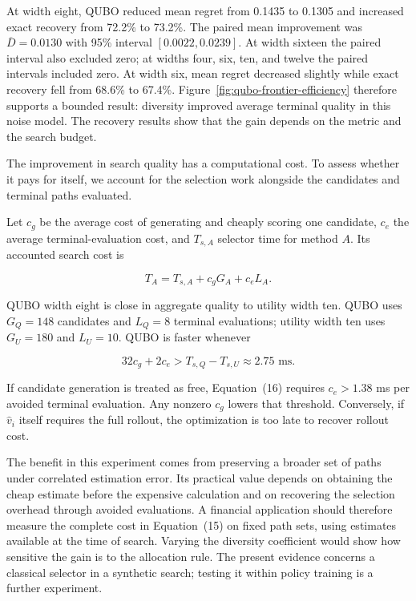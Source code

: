 \documentclass{strategynet-journal}
\begin{document}
At width eight, QUBO reduced mean regret from 0.1435 to 0.1305 and increased
exact recovery from 72.2\% to 73.2\%.  The paired mean improvement was
$\overline D=0.0130$ with 95\% interval $[0.0022,0.0239]$.  At width sixteen
the paired interval also excluded zero; at widths four, six, ten, and twelve
the paired intervals included zero.  At width six, mean regret decreased slightly while exact recovery
fell from 68.6\% to 67.4\%.  Figure~\ref{fig:qubo-frontier-efficiency} therefore
supports a bounded result: diversity improved average terminal quality in this
noise model. The recovery results show that the gain depends on the metric
and the search budget.

The improvement in search quality has a computational cost. To assess whether
it pays for itself, we account for the selection work alongside the candidates
and terminal paths evaluated.

Let $c_g$ be the average cost of generating and cheaply scoring one candidate,
$c_e$ the average terminal-evaluation cost, and $T_{s,A}$ selector time for
method $A$.  Its accounted search cost is

\[
 T_A=T_{s,A}+c_gG_A+c_eL_A .
 \tag{15}
\]

QUBO width eight is close in aggregate quality to utility width ten.  QUBO
uses $G_Q=148$ candidates and $L_Q=8$ terminal evaluations; utility width ten
uses $G_U=180$ and $L_U=10$.  QUBO is faster whenever

\[
 32c_g+2c_e>T_{s,Q}-T_{s,U}\approx2.75\text{ ms} .
 \tag{16}
\]

If candidate generation is treated as free, Equation~(16) requires
$c_e>1.38$ ms per avoided terminal evaluation.  Any nonzero $c_g$ lowers that
threshold.  Conversely, if $\widehat v_i$ itself requires the full rollout,
the optimization is too late to recover rollout cost.

The benefit in this experiment comes from preserving a broader set of paths
under correlated estimation error. Its practical value depends on obtaining
the cheap estimate before the expensive calculation and on recovering the
selection overhead through avoided evaluations. A financial application
should therefore measure the complete cost in Equation~(15) on fixed path
sets, using estimates available at the time of search. Varying the diversity
coefficient would show how sensitive the gain is to the allocation rule.
The present evidence concerns a classical selector in a synthetic search;
testing it within policy training is a further experiment.
\end{document}
